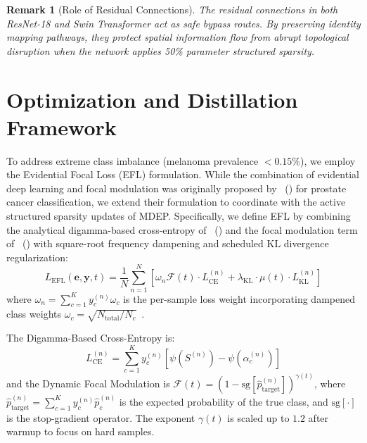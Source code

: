 \documentclass[letterpaper]{article} %
\newtheorem{remark}{Remark}
\begin{document}
\begin{remark}[Role of Residual Connections]
The residual connections in both ResNet-18 and Swin Transformer act as safe bypass routes. By preserving identity mapping pathways, they protect spatial information flow from abrupt topological disruption when the network applies 50\% parameter structured sparsity.
\end{remark}

\section{Optimization and Distillation Framework}\label{sec:optimization}

To address extreme class imbalance (melanoma prevalence $<0.15\%$), we employ the Evidential Focal Loss (EFL) formulation. While the combination of evidential deep learning and focal modulation was originally proposed by \citeauthor{zhou2023domain}~(\citeyear{zhou2023domain}) for prostate cancer classification, we extend their formulation to coordinate with the active structured sparsity updates of MDEP. Specifically, we define EFL by combining the analytical digamma-based cross-entropy of \citeauthor{sensoy2018evidential}~(\citeyear{sensoy2018evidential}) and the focal modulation term of \citeauthor{lin2017focal}~(\citeyear{lin2017focal}) with square-root frequency dampening and scheduled KL divergence regularization:
\begin{equation}\label{eq:efl}
    L_{\text{EFL}}(\bm{e}, \bm{y}, t) = \frac{1}{N} \sum_{n=1}^N \left[\omega_n \mathcal{F}(t) \cdot L_{\text{CE}}^{(n)} + \lambda_{\text{KL}} \cdot \mu(t) \cdot L_{\text{KL}}^{(n)}\right]
\end{equation}
where $\omega_n = \sum_{c=1}^K y_c^{(n)} \omega_c$ is the per-sample loss weight incorporating dampened class weights $\omega_c = \sqrt{N_{\text{total}} / N_c}$~\cite{cui2019class}. 

The Digamma-Based Cross-Entropy is:
\begin{equation}
    L_{\text{CE}}^{(n)} = \sum_{c=1}^K y_c^{(n)} \left[\psi(S^{(n)}) - \psi(\alpha_c^{(n)})\right]
\end{equation}
and the Dynamic Focal Modulation is $\mathcal{F}(t) = (1 - \text{sg}[\hat{p}_{\text{target}}^{(n)}])^{\gamma(t)}$, where $\hat{p}_{\text{target}}^{(n)} = \sum_{c=1}^K y_c^{(n)} \hat{p}_c^{(n)}$ is the expected probability of the true class, and $\text{sg}[\cdot]$ is the stop-gradient operator. The exponent $\gamma(t)$ is scaled up to $1.2$ after warmup to focus on hard samples.
\end{document}
